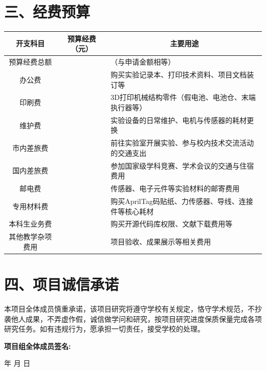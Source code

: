 \documentclass[a4paper,12pt]{ctexart}
\begin{document}
\section*{三、经费预算}
\begin{table}[h!]
    \centering
    \begin{tabularx}{\textwidth}{|c|c|X|}
        \hline
        \textbf{开支科目} & \textbf{预算经费（元）} & \multicolumn{1}{c|}{\textbf{主要用途}} \\
        \hline
        预算经费总额 &  & （与申请金额相等） \\
        \hline
        办公费 &  & 购买实验记录本、打印技术资料、项目文档装订等 \\
        \hline
        印刷费 &  & 3D打印机械结构零件（假电池、电池仓、末端执行器等） \\
        \hline
        维护费 &  & 实验设备的日常维护、电机与传感器的耗材更换 \\
        \hline
        市内差旅费 &  & 前往实验室开展实验、参与校内技术交流活动的交通支出 \\
        \hline
        国内差旅费 &  & 参加国家级学科竞赛、学术会议的交通与住宿费用 \\
        \hline
        邮电费 &  & 传感器、电子元件等实验材料的邮寄费用 \\
        \hline
        专用材料费 &  & 购买AprilTag码贴纸、力传感器、导线、连接件等核心耗材 \\
        \hline
        本科生业务费 &  & 购买开源代码库权限、文献下载费用等 \\
        \hline
        其他教学杂项费用 &  & 项目验收、成果展示等相关费用 \\
        \hline
    \end{tabularx}
\end{table}

\section*{四、项目诚信承诺}
本项目全体成员慎重承诺，该项目研究将遵守学校有关规定，恪守学术规范，不抄袭他人成果，不弄虚作假，诚信做学问和研究，按项目研究进度保质保量完成各项研究任务。如有违规行为，愿承担一切责任，接受学校的处理。

\vspace{2em}
\noindent \textbf{项目组全体成员签名:}

\vspace{2em}
\hfill 年 \quad 月 \quad 日

\vspace{2em}
\end{document}
